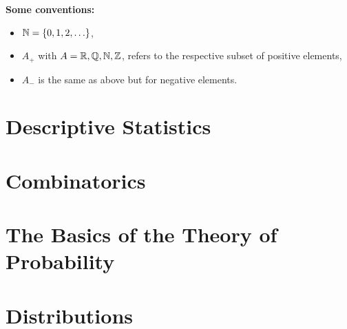 \documentclass[12pt]{article}
\begin{document}
\maketitle
\tableofcontents
\newpage
\textbf{Some conventions:} 
\begin{itemize}
    \item $\mathbb{N} = \{0,1,2, \ldots \}$,
    \item $A_+$ with $A = \mathbb{R}, \mathbb{Q}, \mathbb{N}, \mathbb{Z}$, refers to the respective subset of positive elements,
    \item $A_-$ is the same as above but for negative elements. 
\end{itemize}
\section{Descriptive Statistics}

\section{Combinatorics}

\section{The Basics of the Theory of Probability}

\section{Distributions}

\end{document}
